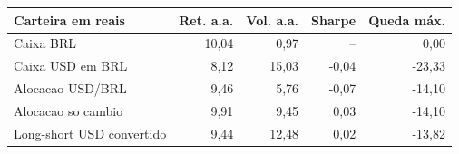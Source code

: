 \begin{tabular}{lrrrr}
\toprule
Carteira em reais & Ret. a.a. & Vol. a.a. & Sharpe & Queda máx. \\
\midrule
Caixa BRL & 10,04 & 0,97 & -- & 0,00 \\
Caixa USD em BRL & 8,12 & 15,03 & -0,04 & -23,33 \\
Alocacao USD/BRL & 9,46 & 5,76 & -0,07 & -14,10 \\
Alocacao so cambio & 9,91 & 9,45 & 0,03 & -14,10 \\
Long-short USD convertido & 9,44 & 12,48 & 0,02 & -13,82 \\
\bottomrule
\end{tabular}